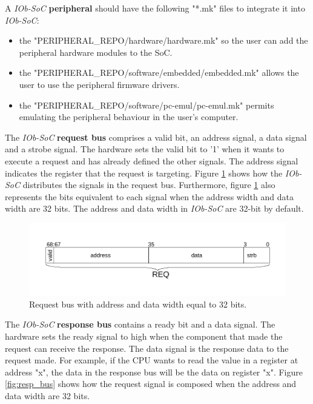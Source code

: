 A \textit{IOb-SoC} \textbf{peripheral} should have the following "*.mk" files to integrate it into \textit{IOb-SoC}:
\begin{itemize}
    \item the "PERIPHERAL\_REPO/hardware/hardware.mk" so the user can add the peripheral hardware modules to the SoC.
    \item the "PERIPHERAL\_REPO/software/embedded/embedded.mk" allows the user to use the peripheral firmware drivers.
    \item the "PERIPHERAL\_REPO/software/pc-emul/pc-emul.mk" permits emulating the peripheral behaviour in the user's computer.
\end{itemize}

The \textit{IOb-SoC} \textbf{request bus} comprises a valid bit, an address signal, a data signal and a strobe signal. The hardware sets the valid bit to '1' when it wants to execute a request and has already defined the other signals. The address signal indicates the register that the request is targeting. Figure \ref{fig:req_bus} shows how the \textit{IOb-SoC} distributes the signals in the request bus. Furthermore, figure \ref{fig:req_bus} also represents the bits equivalent to each signal when the address width and data width are 32 bits. The address and data width in \textit{IOb-SoC} are 32-bit by default.

\begin{figure}[!ht]
    \centering
    \includegraphics[width=\linewidth]{../images/req_bus.pdf}
    \caption{Request bus with address and data width equal to 32 bits.}
    \label{fig:req_bus}
\end{figure}

The \textit{IOb-SoC} \textbf{response bus} contains a ready bit and a data signal. The hardware sets the ready signal to high when the component that made the request can receive the response. The data signal is the response data to the request made. For example, if the CPU wants to read the value in a register at address "x", the data in the response bus will be the data on register "x". Figure \ref{fig:resp_bus} shows how the request signal is composed when the address and data width are 32 bits.

